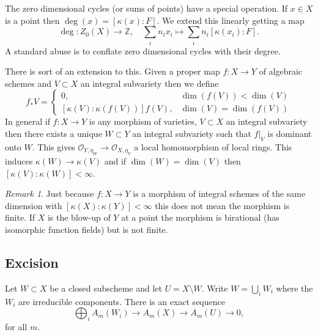 \documentclass[12pt]{article}
\numberwithin{equation}{section}
\theoremstyle{definition}
\theoremstyle{remark}
\newtheorem{remark}[theorem]{Remark}
\newcommand{\ZZ}{\mathbb{Z}}
\newcommand{\Ocal}{\mathcal{O}}
\newcommand{\PP}{\mathbb{P}}
\newcommand{\Pic}{\operatorname{Pic}}
\begin{document}
The zero dimensional cycles (or sums of points) have a special operation. 
If $x\in X$ is a point then $\deg(x) = [\kappa(x):F]$. We extend this linearly getting a map 
 $$ \deg:Z_0(X) \to \ZZ, \quad \sum_{i} n_i x_i \mapsto \sum_i n_i [\kappa(x_i):F]. $$
A standard abuse is to conflate zero dimensional cycles with their degree.  

There is sort of an extension to this. 
Given a proper map $f:X\to Y$ of algebraic schemes and $V\subset X$ an integral subvariety then we define  
 $$ f_*V= \begin{cases}
 0, & \dim(f(V)) < \dim(V) \\
 [\kappa(V):\kappa(f(V))]  f(V), & \dim(V) = \dim(f(V))
 \end{cases}$$
In general if $f:X \to Y$ is any morphism of varieties, $V\subset X$ an integral subvariety then there exists a unique $W \subset Y$ an integral subvariety such that $f\vert_V$ is dominant onto $W$. 
This gives $\Ocal_{Y,\eta_W} \to \Ocal_{X,\eta_V}$ a local homomorphism of local rings.
This induces $\kappa(W) \to \kappa(V)$ and if $\dim(W)=\dim(V)$ then $[\kappa(V):\kappa(W)]<\infty$.

\begin{remark}
	Just because $f:X\to Y$ is a morphism of integral schemes of the same dimension with $[\kappa(X):\kappa(Y)]<\infty$ this does not mean the morphism is finite. 
	If $X$ is the blow-up of $Y$ at a point the morphism is birational (has isomorphic function fields) but is not finite. 
\end{remark}

\subsection{Excision}
Let $W \subset X$ be a closed subscheme and let $U = X\setminus W$. 
Write $W = \bigcup_i W_i$ where the $W_i$ are irreducible components.
There is an exact sequence
 $$ \bigoplus_i A_m(W_i) \to A_m(X) \to A_m(U) \to 0,$$
for all $m$. 
\end{document}
